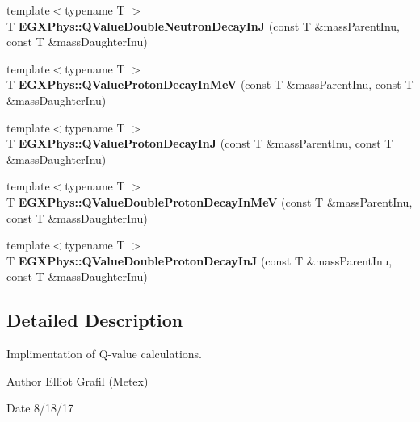 \begin{DoxyCompactItemize}
\item 
{\footnotesize template$<$typename T $>$ }\\T {\bfseries E\+G\+X\+Phys\+::\+Q\+Value\+Double\+Neutron\+Decay\+InJ} (const T \&mass\+Parent\+Inu, const T \&mass\+Daughter\+Inu)
\item 
{\footnotesize template$<$typename T $>$ }\\T {\bfseries E\+G\+X\+Phys\+::\+Q\+Value\+Proton\+Decay\+In\+MeV} (const T \&mass\+Parent\+Inu, const T \&mass\+Daughter\+Inu)
\item 
{\footnotesize template$<$typename T $>$ }\\T {\bfseries E\+G\+X\+Phys\+::\+Q\+Value\+Proton\+Decay\+InJ} (const T \&mass\+Parent\+Inu, const T \&mass\+Daughter\+Inu)
\item 
{\footnotesize template$<$typename T $>$ }\\T {\bfseries E\+G\+X\+Phys\+::\+Q\+Value\+Double\+Proton\+Decay\+In\+MeV} (const T \&mass\+Parent\+Inu, const T \&mass\+Daughter\+Inu)
\item 
{\footnotesize template$<$typename T $>$ }\\T {\bfseries E\+G\+X\+Phys\+::\+Q\+Value\+Double\+Proton\+Decay\+InJ} (const T \&mass\+Parent\+Inu, const T \&mass\+Daughter\+Inu)
\end{DoxyCompactItemize}


\subsection{Detailed Description}
Implimentation of Q-\/value calculations. 

\begin{DoxyAuthor}{Author}
Elliot Grafil (Metex) 
\end{DoxyAuthor}
\begin{DoxyDate}{Date}
8/18/17 
\end{DoxyDate}
